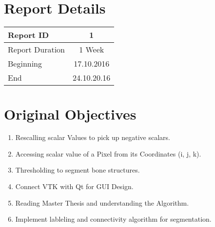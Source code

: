 \documentclass[10pt, b5paper]{article}
\begin{document}
\title{\rmfamily\normalfont{}}

\author{{\small Automatic Mandible Segmentation Using VTK}}

\date{\footnotesize{\today}}

\maketitle

% 
 


\section{Report Details}
\begin{center}
\begin{tabular}{ l | c }
\hline 
Report ID & 1  \\ %
\hline 
Report Duration & 1 Week \\ %
\hline 
Beginning & 17.10.2016 \\ %
\hline 
End & 24.10.20.16 \\ %
\hline 
\end{tabular}
\end{center}

\section{Original Objectives}
\begin{enumerate}
\item Rescalling scalar Values to pick up negative scalars.
\item Accessing scalar value of a Pixel from its Coordinates (i, j, k).
\item Thresholding to segment bone structures.
\item Connect VTK with Qt for GUI Design.
\item Reading Master Thesis and understanding the Algorithm.
\item Implement lableling and connectivity algorithm for segmentation.
\end{enumerate}
\end{document}
